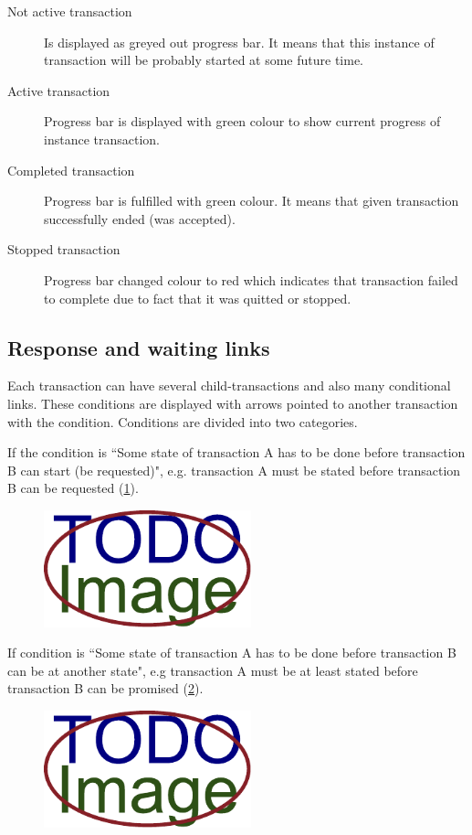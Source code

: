     \begin{description}
    	\item[Not active transaction] Is displayed as greyed out progress bar. It means that this instance of transaction will be probably started at some future time.

        \item[Active transaction] Progress bar is displayed with green colour to show current progress of instance transaction. 
        
        \item[Completed transaction] Progress bar is fulfilled with green colour. It means that given transaction successfully ended (was accepted).
        
        \item[Stopped transaction] Progress bar changed colour to red which indicates that transaction failed to complete due to fact that it was quitted or stopped. 
    \end{description}
    
 \subsection{Response and waiting links}
   Each transaction can have several child-transactions and also many conditional links. These conditions are displayed with arrows pointed to another transaction with the condition.
Conditions are divided into two categories.

If the condition is ``Some state of transaction A has to be done before transaction B can start (be requested)", e.g. transaction A must be stated before transaction B can be requested (\cref{fig:request-start-condition}).

\begin{figure}
  \centering
  \includegraphics[width=6cm,keepaspectratio]{img/TODO-image}
  \caption{}
  \label{fig:request-start-condition}
\end{figure}  

If condition is ``Some state of transaction A has to be done before transaction B can be at another state", e.g transaction A must be at least stated before transaction B can be promised (\cref{fig:state-state-condition}).

\begin{figure}
  \centering
  \includegraphics[width=6cm,keepaspectratio]{img/TODO-image}
  \caption{}
  \label{fig:state-state-condition}
\end{figure}  


